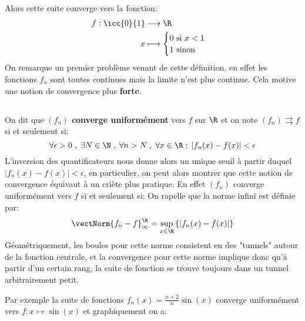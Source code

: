 Alors cette suite converge vers la fonction:
\[
   \begin{aligned}
      f : \icc{0}{1} &\longrightarrow \R\\
      x &\longmapsto \begin{cases}
         0 \text{ si } x < 1 \\
         1 \text{ sinon}
      \end{cases} 
   \end{aligned}
\]
On remarque un premier problème venant de cette définition, en effet les fonctions \(f_n\) sont toutes continues mais la limite n'est plus continue. Cela motive une notion de convergence plus \textbf{forte}.
\subsection*{}
On dit que \((f_n)\) \textbf{converge uniformément} vers \(f\) sur \(\R\) et on note \((f_n) \rightrightarrows f\) si et seulement si:
\[
   \forall \epsilon > 0 \; , \; \exists N \in \N \; , \; \forall n > N \; , \; \forall x \in \R \; ; \; |f_n(x) - f(x)| < \epsilon
\]
L'inversion des quantificateurs nous donne alors un unique seuil à partir duquel \(|f_n(x) - f(x)| < \epsilon\), en particulier, on peut alors montrer que cette notion de convergence équivaut à un criète plus pratique. En effet \((f_n)\) converge uniformément vers \(f\) si et seulement si:
On rapelle que la norme infini est définie par:
\[
   \vectNorm{f_n - f}_\infty^\R = \underset{x \in \R}{\sup}\left\{\left|f_n(x) - f(x)\right|\right\}
\]
Géométriquement, les boules pour cette norme consistent en des "tunnels" autour de la fonction centrale, et la convergence pour cette norme implique donc qu'à partir d'un certain rang, la suite de fonction se trouve toujours dans un tunnel arbitrairement petit.
\pagebreak

Par exemple la suite de fonctions \(f_n(x) = \frac{n + 2}{n}\sin(x)\) converge uniformément vers \(f: x \mapsto \sin(x)\) et graphiquement on a:

